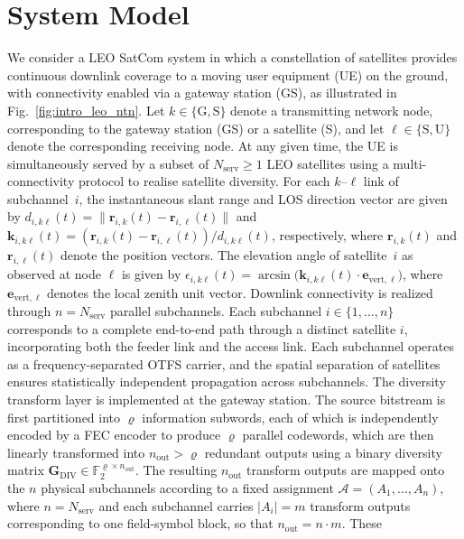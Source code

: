 \documentclass[lettersize,journal]{IEEEtran}
\newcommand{\vect}[1]{\bm{#1}}
\begin{document}
\section{System Model}
\label{sec:system_model}
We consider a LEO SatCom system in which a constellation of satellites 
provides continuous downlink coverage to a moving user equipment (UE) 
on the ground, with connectivity enabled via a gateway station (GS), 
as illustrated in Fig.~\ref{fig:intro_leo_ntn}. Let 
$k \in \{\mathrm{G},\mathrm{S}\}$ denote a transmitting network node, 
corresponding to the gateway station (GS) or a satellite (S), and let 
$\ell \in \{\mathrm{S},\mathrm{U}\}$ denote the corresponding receiving 
node. At any given time, the UE is simultaneously served by a subset of 
$N_{\text{serv}} \ge 1$ LEO satellites using a multi-connectivity 
protocol to realise satellite diversity. For each $k$--$\ell$ link of subchannel~$i$, the instantaneous slant 
range and LOS direction vector are given by 
$d_{i,k\ell}(t) = \|\vect{r}_{i,k}(t) - \vect{r}_{i,\ell}(t)\|$ and 
$\vect{k}_{i,k\ell}(t) = (\vect{r}_{i,k}(t) - 
\vect{r}_{i,\ell}(t))/d_{i,k\ell}(t)$, respectively, where 
$\vect{r}_{i,k}(t)$ and $\vect{r}_{i,\ell}(t)$ denote the position 
vectors. The elevation angle of satellite~$i$ 
as observed at node $\ell$ is given by 
$\epsilon_{i,k\ell}(t)=\arcsin\!\bigl(\vect{k}_{i,k\ell}(t) \cdot 
\vect{e}_{\mathrm{vert},\ell}\bigr)$, where 
$\vect{e}_{\mathrm{vert},\ell}$ denotes the local zenith unit vector. Downlink connectivity is realized through $n = N_{\text{serv}}$ parallel subchannels. Each subchannel $i \in \{1,\ldots,n\}$ corresponds to a complete end-to-end path through a distinct satellite $i$, incorporating both the feeder link and the access link. Each subchannel operates as a frequency-separated OTFS 
carrier, and the spatial separation of satellites ensures statistically 
independent propagation across subchannels. The diversity transform layer is implemented at the gateway station. The source bitstream is first partitioned into $\varrho$ information 
subwords, each of which is independently encoded by a FEC encoder to produce $\varrho$ parallel codewords, 
which are then linearly transformed into $n_{\text{out}} > \varrho$ 
redundant outputs using a binary diversity matrix 
$\mathbf{G}_{\mathrm{DIV}} \in \mathbb{F}_2^{\varrho \times n_{\text{out}}}$. The resulting $n_{\text{out}}$ transform outputs are mapped onto the $n$ physical subchannels according to a fixed assignment $\mathcal{A} = (A_1,\ldots,A_n)$, where $n = N_{\text{serv}}$ and each subchannel carries $|A_i| = m$ transform outputs corresponding to one field-symbol block, so that $n_{\text{out}} = n \cdot m$. These 
\end{document}
